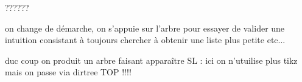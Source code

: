 ??????

on change de démarche, on s'appuie sur l'arbre pour essayer de valider une intuition consistant à toujours chercher à obtenir une liste plus petite etc...

duc coup on produit un arbre faisant apparaître SL : ici on n'utuilise plus tikz mais on passe via dirtree TOP !!!!